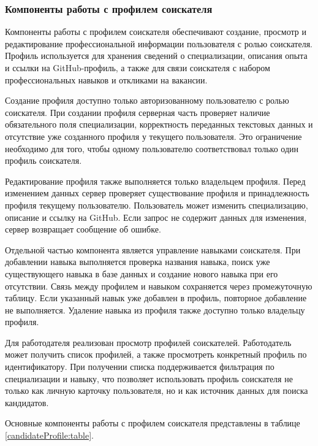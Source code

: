 \subsubsection{Компоненты работы с профилем соискателя}

Компоненты работы с профилем соискателя обеспечивают создание, просмотр и редактирование профессиональной информации пользователя с ролью соискателя. Профиль используется для хранения сведений о специализации, описания опыта и ссылки на GitHub-профиль, а также для связи соискателя с набором профессиональных навыков и откликами на вакансии.

Создание профиля доступно только авторизованному пользователю с ролью соискателя. При создании профиля серверная часть проверяет наличие обязательного поля специализации, корректность переданных текстовых данных и отсутствие уже созданного профиля у текущего пользователя. Это ограничение необходимо для того, чтобы одному пользователю соответствовал только один профиль соискателя.

Редактирование профиля также выполняется только владельцем профиля. Перед изменением данных сервер проверяет существование профиля и принадлежность профиля текущему пользователю. Пользователь может изменить специализацию, описание и ссылку на GitHub. Если запрос не содержит данных для изменения, сервер возвращает сообщение об ошибке.

Отдельной частью компонента является управление навыками соискателя. При добавлении навыка выполняется проверка названия навыка, поиск уже существующего навыка в базе данных и создание нового навыка при его отсутствии. Связь между профилем и навыком сохраняется через промежуточную таблицу. Если указанный навык уже добавлен в профиль, повторное добавление не выполняется. Удаление навыка из профиля также доступно только владельцу профиля.

Для работодателя реализован просмотр профилей соискателей. Работодатель может получить список профилей, а также просмотреть конкретный профиль по идентификатору. При получении списка поддерживается фильтрация по специализации и навыку, что позволяет использовать профиль соискателя не только как личную карточку пользователя, но и как источник данных для поиска кандидатов.

Основные компоненты работы с профилем соискателя представлены в таблице \ref{candidateProfile:table}.

